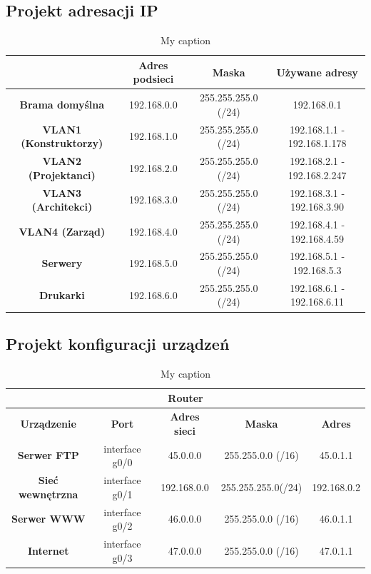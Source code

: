 \documentclass{article}
\begin{document}
\subsection{Projekt adresacji IP}
\begin{table}[H]
	\centering
	\caption{My caption}
	\begin{tabular}{|c|c|c|c|}
		\hline
		& \textbf{Adres podsieci} & \textbf{Maska}      & \textbf{Używane adresy}     \\ \hline
		\textbf{Brama domyślna} & 192.168.0.0             & 255.255.255.0 (/24) & 192.168.0.1                 \\ \hline
		\textbf{VLAN1 (Konstruktorzy)}          & 192.168.1.0             & 255.255.255.0 (/24) & 192.168.1.1 - 192.168.1.178 \\ \hline
		\textbf{VLAN2 (Projektanci)}          & 192.168.2.0             & 255.255.255.0 (/24) & 192.168.2.1 - 192.168.2.247 \\ \hline
		\textbf{VLAN3 (Architekci)}          & 192.168.3.0             & 255.255.255.0 (/24) & 192.168.3.1 - 192.168.3.90  \\ \hline
		\textbf{VLAN4 (Zarząd)}          & 192.168.4.0             & 255.255.255.0 (/24) & 192.168.4.1 - 192.168.4.59  \\ \hline
		\textbf{Serwery}        & 192.168.5.0             & 255.255.255.0 (/24) & 192.168.5.1 - 192.168.5.3   \\ \hline
		\textbf{Drukarki}       & 192.168.6.0             & 255.255.255.0 (/24) & 192.168.6.1 - 192.168.6.11  \\ \hline
	\end{tabular}
\end{table}

\newpage
\subsection{Projekt konfiguracji urządzeń}
\begin{table}[H]
	\centering
	\caption{My caption}
	\begin{tabular}{|c|c|c|c|c|}
		\hline
		\multicolumn{5}{|c|}{\textbf{Router}}                                                                  \\ \hline
		\textbf{Urządzenie}      & \textbf{Port}  & \textbf{Adres sieci} & \textbf{Maska}     & \textbf{Adres} \\ \hline
		\textbf{Serwer FTP}      & interface g0/0 & 45.0.0.0             & 255.255.0.0 (/16)  & 45.0.1.1       \\ \hline
		\textbf{Sieć wewnętrzna} & interface g0/1 & 192.168.0.0          & 255.255.255.0(/24) & 192.168.0.2    \\ \hline
		\textbf{Serwer WWW}      & interface g0/2 & 46.0.0.0             & 255.255.0.0 (/16)  & 46.0.1.1       \\ \hline
		\textbf{Internet}        & interface g0/3 & 47.0.0.0             & 255.255.0.0 (/16)  & 47.0.1.1       \\ \hline
	\end{tabular}
\end{table}
\end{document}
